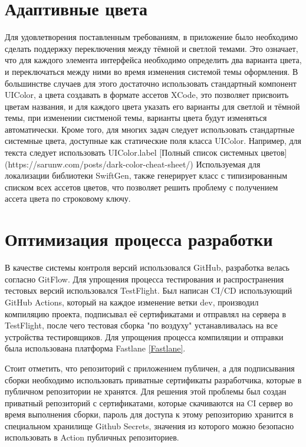   \section{Адаптивные цвета}
    Для удовлетворения поставленным требованиям, в приложение было необходимо сделать поддержку переключения между тёмной и светлой темами. Это означает, что для каждого элемента интерфейса необходимо определить два варианта цвета, и переключаться между ними во время изменения системой темы оформления. В большинстве случаев для этого достаточно использовать стандартный компонент UIColor, а цвета создавать в формате ассетов XCode, это позволяет присвоить цветам названия, и для каждого цвета указать его варианты для светлой и тёмной темы, при изменении систменой темы, варианты цвета будут изменяться автоматически. Кроме того, для многих задач следует использовать стандартные системные цвета, доступные как статические поля класса UIColor. Например, для текста следует использовать UIColor.label [Полный список системных цветов](https://sarunw.com/posts/dark-color-cheat-sheet/)
    Используемая для локализации библиотеки SwiftGen, также генерирует класс с типизированным списком всех ассетов цветов, что позволяет решить проблему с получением ассета цвета по строковому ключу.

  \section{Оптимизация процесса разработки}
    В качестве системы контроля версий использовался GitHub, разработка велась согласно GitFlow. Для упрощения процесса тестирования и распространения тестовых версий использовался TestFlight. Был написан CI/CD использующий GitHub Actions, который на каждое изменение ветки dev, производил компиляцию проекта, подписывал её сертификатами и отправлял на сервера в TestFlight, после чего тестовая сборка "по воздуху" устанавливалась на все устройства тестировщиков. Для упрощения процесса компиляции и отправки была использована платформа Fastlane \ref{Fastlane}.

    Стоит отметить, что репозиторий с приложением публичен, а для подписывания сборки необходимо использовать приватные сертификаты разработчика, которые в публичном репозитории не хранятся. Для решения этой проблемы был создан приватный репозиторий с сертификатами, которые скачиваются на CI сервер во время выполнения сборки, пароль для доступа к этому репозиторию хранится в специальном хранилище Github Secrets, значения из которого можно безопасно использовать в Action публичных репозиториев.


